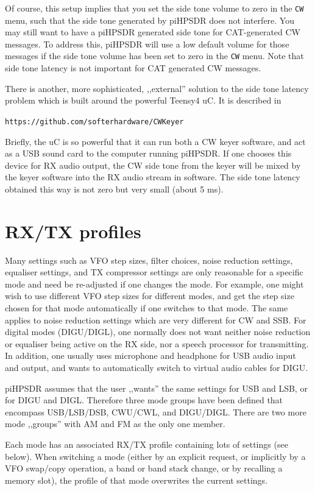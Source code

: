 \documentclass[12pt]{book}
\def\bltt#1{\texttt{\color{blue}#1}}
\def\pH{pi\-HPSDR\xspace}
\begin{document}
Of course, this setup implies that you set the side
tone volume to zero in the \bltt{CW} menu, such that the side tone generated by \pH
does not interfere. You may still want to have a \pH generated side tone for
CAT-generated CW messages. To address this, \pH will use
a low default volume for those messages if the side tone volume has been set to zero
in the \bltt{CW} menu. Note that side tone latency is not important for CAT generated
CW messages.

There is another, more sophisticated, ,,external'' solution to the side tone latency
problem which is built around the powerful Teensy4 uC. It is described in

\texttt{https://github.com/softerhardware/CWKeyer}

Briefly, the uC is so powerful
that it can run both a CW keyer software, and act as a USB sound card to the
computer running \pH. If one chooses this device for RX audio output, the CW side tone
from the keyer will be mixed by the keyer software into the RX audio stream in software.
The side tone latency obtained this way is not zero but very small (about 5 ms).

\chapter{RX/TX profiles}
\label{sec:rxtxprofiles}
Many settings such as VFO step sizes, filter choices, noise reduction
settings, equaliser settings, and TX compressor settings
are only reasonable for a specific mode and need be re-adjusted if one changes
the mode. For example, one might wish to use
different VFO step sizes for different modes, and get the step size chosen for that
mode automatically if one switches to that mode. The same applies to noise reduction
settings which are very different for CW and SSB. For digital modes (DIGU/DIGL),
one normally does not want neither noise reduction or equaliser being active on the RX
side, nor a speech processor for transmitting. In addition, one usually uses
microphone and headphone for USB audio input and output, and wants to automatically
switch to virtual audio cables for DIGU.

\pH assumes that the user ,,wants'' the same settings for USB and LSB, or for DIGU and DIGL.
Therefore three mode groups have been defined that encompass USB/LSB/DSB, CWU/CWL, and
DIGU/DIGL. There are two more mode ,,groups'' with AM and FM  as the only one member.

Each mode  has an associated RX/TX profile containing lots of settings (see below).
When switching a mode (either by an explicit request, or implicitly by a VFO swap/copy
operation, a band or band stack change, or by recalling a memory slot), the profile of
that mode overwrites the current settings.
\end{document}
